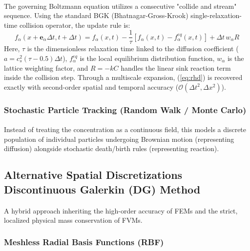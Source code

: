\paragraph{}
The governing Boltzmann equation utilizes a consecutive "collide and stream" sequence. Using the standard BGK (Bhatnagar-Gross-Krook) single-relaxation-time collision operator, the update rule is:
\begin{equation*}
f_\alpha(x + \mathbf{e}_\alpha \Delta t, t + \Delta t) = f_\alpha(x, t) - \frac{1}{\tau} \left[ f_\alpha(x, t) - f_\alpha^{eq}(x, t) \right] + \Delta t \, w_\alpha R
\end{equation*}
Here, $\tau$ is the dimensionless relaxation time linked to the diffusion coefficient ($a = c_s^2(\tau - 0.5)\Delta t$), $f_\alpha^{eq}$ is the local equilibrium distribution function, $w_\alpha$ is the lattice weighting factor, and $R = -kC$ handles the linear sink reaction term inside the collision step. Through a multiscale expansion,  (\ref{eq:rhd}) is recovered exactly with second-order spatial and temporal accuracy ($\mathcal{O}(\Delta t^2, \Delta x^2)$).

\subsubsection*{Stochastic Particle Tracking (Random Walk / Monte Carlo)}
\paragraph{}
Instead of treating the concentration as a continuous field, this models a discrete population of individual particles undergoing Brownian motion (representing diffusion) alongside stochastic death/birth rules (representing reaction).

\subsection*{Alternative Spatial Discretizations \\ \normalsize Discontinuous Galerkin (DG) Method} 
\paragraph{}
A hybrid approach inheriting the high-order accuracy of FEMs and the strict, localized physical mass conservation of FVMs.

\subsubsection*{Meshless Radial Basis Functions (RBF)} 
